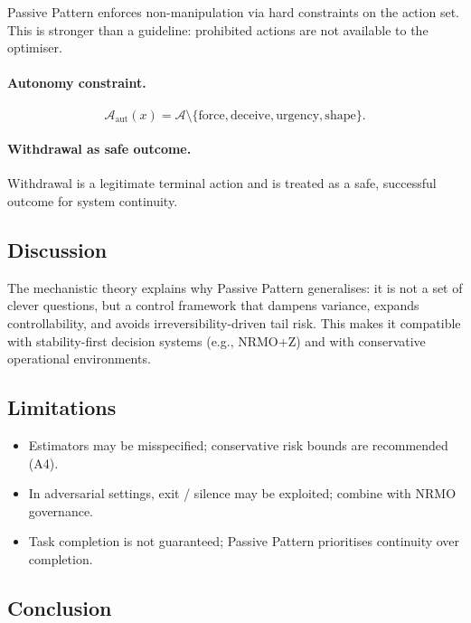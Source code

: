 Passive Pattern enforces non-manipulation via hard constraints on
the action set. This is stronger than a guideline: prohibited
actions are not available to the optimiser.

\paragraph{Autonomy constraint.}

\begin{equation}
\mathcal{A}_{\mathrm{aut}}(x) = \mathcal{A} \setminus
\{\mathrm{force}, \mathrm{deceive}, \mathrm{urgency},
\mathrm{shape}\}.
\label{eq:pp-autonomy-set}
\end{equation}

\paragraph{Withdrawal as safe outcome.}
Withdrawal is a legitimate terminal action and is treated as a safe,
successful outcome for system continuity.

\subsection{Discussion}
\label{sec:pp-discussion}

The mechanistic theory explains why Passive Pattern generalises: it
is not a set of clever questions, but a control framework that
dampens variance, expands controllability, and avoids
irreversibility-driven tail risk. This makes it compatible with
stability-first decision systems (e.g., NRMO+Z) and with
conservative operational environments.

\subsection{Limitations}
\label{sec:pp-limitations}

\begin{itemize}
\item Estimators may be misspecified; conservative risk bounds are
recommended (A4).
\item In adversarial settings, exit / silence may be exploited;
combine with NRMO governance.
\item Task completion is not guaranteed; Passive Pattern prioritises
continuity over completion.
\end{itemize}

\subsection{Conclusion}
\label{sec:pp-conclusion}

